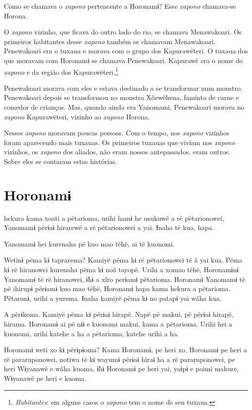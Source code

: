 Como se chamava o \textit{xapono} pertencente a Horonamɨ? Esse \textit{xapono} chamava-se
Horona. 

O \textit{xapono} vizinho, que ficava do outro lado do rio, se chamava
Menawakoari. Os primeiros habitantes desse \textit{xapono} também se
chamavam Menawakoari. Penewakoari era o tuxaua e morava com o grupo dos
Kapurawëteri. O tuxaua dos que moravam com Horonamɨ se chamava
Penewakoari. Kapurawë era o nome do \textit{xapono} e da região dos
Kapurawëteri.\footnote{\textit{Habitantes}: em alguns casos o \textit{xapono} tem o nome de seu tuxaua.}

Penewakoari morava com eles e estava destinado a se transformar num
monstro. Penewakoari depois se transformou no monstro Xõewëhena, faminto
de carne e comedor de crianças. Mas, quando ainda era Yanomami,
Penewakoari morava no \textit{xapono} Kapurawëteri, vizinho ao
\textit{xapono} Horona.

Nesses \textit{xapono} moravam poucas pessoas. Com o tempo, nos \textit{xapono} vizinhos
foram aparecendo mais tuxauas. Os primeiros tuxauas que viviam nos
\textit{xapono} vizinhos, os \textit{xapono} dos aliados, não eram nossos
antepassados, eram outros. Sobre eles se contaram estas histórias.

\chapter{Horonamɨ}

 hekura kama xoati a pëtarioma, urihi hamɨ he usukuwë a rë
pëtarionowei, Yanomamɨ përɨaɨ hirarewë a rë pëtarionowei a yai. Ɨnaha të
kua, hapa. 

Yanomamɨ hei kurenaha pë kuo mao tëhë, ai të kuonomi. 

Wetinɨ pëma kɨ taprarema? Kamiyë pëma kɨ rë pëtarionowei të ã yai kua.
Pëma kɨ rë hiranowei kurenaha pëma kɨ noã tayopë. Urihi a xomao tëhë,
Horonamɨnɨ Yanomamɨ të rë hiranowei, ɨ̃hɨ a xĩro perɨamɨ pëtarioma.
Horonamɨ Yanomamɨ të pë ihirupɨ përɨamɨ kuo mao tëhë, Horonamɨ hapa kama
hekura a pëtarioma. Pëtarunɨ, urihi a yurema. Ɨnaha kamiyë pëma kɨ no
patapɨ yai wãha kua. 

A përɨkema. Kamiyë pëma kɨ përɨaɨ hirapë. Napë pë makui, pë përɨaɨ
hirapë, hirama. Horonamɨ ai pë nɨɨ e kuonomi makui, kama a pëtarioma.
Urihi hei a kuonomi, urihi katehe a ha a pëtarioma, katehe urihi a ha. 

Horonamɨ weti xo kɨ përɨpɨoma? Kama Horonamɨ, pe heri xo, Horonamɨ pe
heri a rë pararuponowei, notiwa të kɨ wayumɨ përɨaɨ hiraɨ ha a rë
pararuponowei, pe heri Wɨyanawë e wãha kuoma, ɨ̃hɨ Horonamɨ pe heri yai,
yaɨpɨ e poimi makure, Wɨyanawë pe heri e kuoma. 

